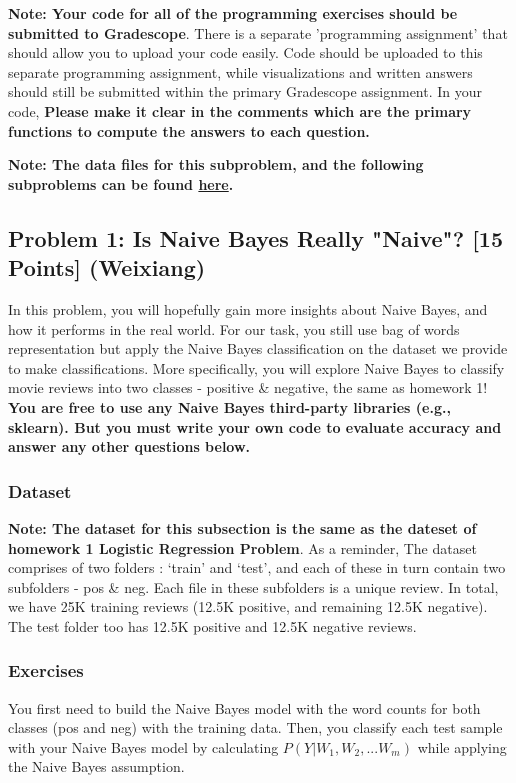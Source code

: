\documentclass{article}
\begin{document}
\textbf{Note: Your code for all of the programming exercises should be submitted to Gradescope}. There is a separate 'programming assignment' that should allow you to upload your code easily. Code should be uploaded to this separate programming assignment, while visualizations and written answers should still be submitted within the primary Gradescope assignment. In your code, \textbf{Please make it clear in the comments which are the primary functions to compute the answers to each question.}

\textbf{Note: The data files for this subproblem, and the following subproblems can be found \href{https://www.dropbox.com/s/amirx7n7aewxzga/10-701_HW2_Dataset.zip?dl=0}{here}.}

\subsection*{Problem 1: Is Naive Bayes Really "Naive"? [15 Points] (Weixiang)} 
In this problem, you will hopefully gain more insights about Naive Bayes, and how it performs in the real world. For our task, you still use bag of words representation but apply the Naive Bayes classification on the dataset we provide to make classifications. More specifically, you will explore Naive Bayes to classify movie reviews into two classes - positive \& negative, the same as homework 1! \textbf{You are free to use any Naive Bayes third-party libraries (e.g., sklearn). But you must write your own code to evaluate accuracy and answer any other questions below.} 

\subsubsection*{Dataset}
\textbf{Note: The dataset for this subsection is the same as the dateset of homework 1 Logistic Regression Problem}. As a reminder, The dataset comprises of two folders : `train' and `test', and each of these in turn contain two subfolders - pos \& neg. Each file in these subfolders is a unique review. In total, we have 25K training reviews (12.5K positive, and remaining 12.5K negative). The test folder too has 12.5K positive and 12.5K negative reviews. 

\subsubsection*{Exercises}
You first need to build the Naive Bayes model with the word counts for both classes (pos and neg) with the training data. Then, you classify each test sample with your Naive Bayes model by calculating  $P(Y | W_1, W_2, ...W_m)$ while applying the Naive Bayes assumption.
\end{document}
